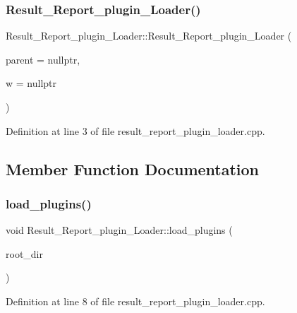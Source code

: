 \subsubsection{\texorpdfstring{Result\+\_\+\+Report\+\_\+plugin\+\_\+\+Loader()}{Result\_Report\_plugin\_Loader()}}
{\footnotesize\ttfamily Result\+\_\+\+Report\+\_\+plugin\+\_\+\+Loader\+::\+Result\+\_\+\+Report\+\_\+plugin\+\_\+\+Loader (\begin{DoxyParamCaption}\item[{Q\+Object $\ast$}]{parent = {\ttfamily nullptr},  }\item[{\hyperlink{classMainWindow}{Main\+Window} $\ast$}]{w = {\ttfamily nullptr} }\end{DoxyParamCaption})\hspace{0.3cm}{\ttfamily [explicit]}}



Definition at line 3 of file result\+\_\+report\+\_\+plugin\+\_\+loader.\+cpp.



\subsection{Member Function Documentation}
\mbox{\label{classResult__Report__plugin__Loader_a15c218e7f32052f74d70fed200922fce}} 
\subsubsection{\texorpdfstring{load\+\_\+plugins()}{load\_plugins()}}
{\footnotesize\ttfamily void Result\+\_\+\+Report\+\_\+plugin\+\_\+\+Loader\+::load\+\_\+plugins (\begin{DoxyParamCaption}\item[{Q\+Dir}]{root\+\_\+dir }\end{DoxyParamCaption})}



Definition at line 8 of file result\+\_\+report\+\_\+plugin\+\_\+loader.\+cpp.

